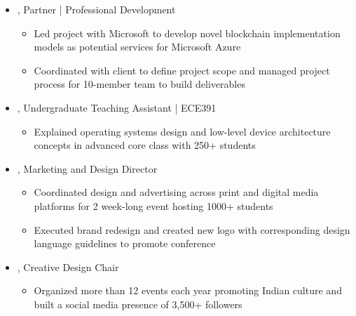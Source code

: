 \documentclass[11pt,letterpaper]{article}
\begin{document}
\begin{itemize}[label={}]
 \item \small{, Partner | Professional Development \hfill {}}
 \vspace{-1.58mm}
 \begin{itemize}[label={}]
 	\item \small{Led project with Microsoft to develop novel blockchain implementation models as potential services for Microsoft Azure}
 	\item \small{Coordinated with client to define project scope and managed project process for 10-member team to build deliverables}
 \end{itemize}
 \item \small{, Undergraduate Teaching Assistant | ECE391 \hfill {}}
 \vspace{-1.58mm}
 \begin{itemize}[label={}]
 	\item \small{Explained operating systems design and low-level device architecture concepts in advanced core class with 250+ students}
 \end{itemize}
 \item \small{, Marketing and Design Director \hfill {}}
 \vspace{-1.58mm}
 \begin{itemize}[label={}]
 	\item \small{Coordinated design and advertising across print and digital media platforms for 2 week-long event hosting 1000+ students}
 	\item \small{Executed brand redesign and created new logo with corresponding design language guidelines to promote conference}
 \end{itemize}
 \item \small{, Creative Design Chair \hfill {}}
 \vspace{-1.58mm}
 \begin{itemize}[label={}]
 	\item \small{Organized more than 12 events each year promoting Indian culture and built a social media presence of 3,500+ followers}
 \end{itemize}
\end{itemize}
\end{document}
